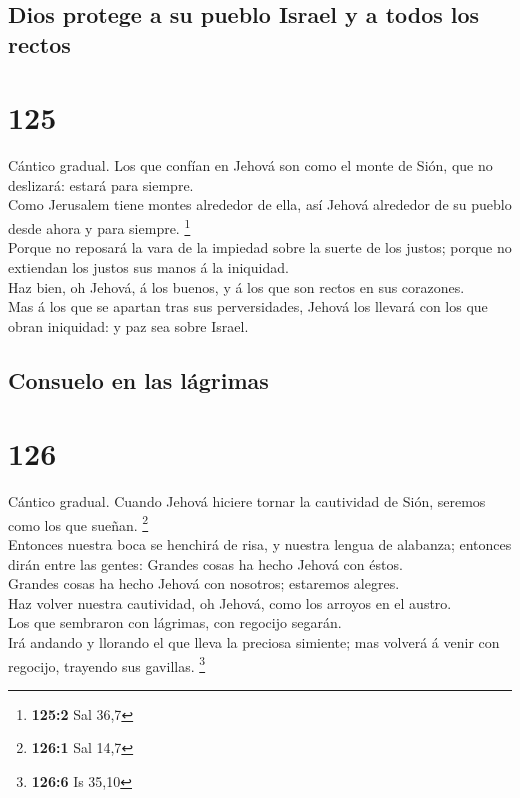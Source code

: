 \hypertarget{dios-protege-a-su-pueblo-israel-y-a-todos-los-rectos}{%
\subsection{Dios protege a su pueblo Israel y a todos los
rectos}\label{dios-protege-a-su-pueblo-israel-y-a-todos-los-rectos}}

\hypertarget{section-124}{%
\section{125}\label{section-124}}

 Cántico gradual. Los que confían en Jehová son como el
monte de Sión, que no deslizará: estará para siempre.\\
 Como Jerusalem tiene montes alrededor de ella, así Jehová
alrededor de su pueblo desde ahora y para siempre. \footnote{\textbf{125:2}
  Sal 36,7}\\
 Porque no reposará la vara de la impiedad sobre la suerte
de los justos; porque no extiendan los justos sus manos á la
iniquidad.\\
 Haz bien, oh Jehová, á los buenos, y á los que son rectos
en sus corazones.\\
 Mas á los que se apartan tras sus perversidades, Jehová
los llevará con los que obran iniquidad: y paz sea sobre Israel.

\hypertarget{consuelo-en-las-luxe1grimas}{%
\subsection{Consuelo en las
lágrimas}\label{consuelo-en-las-luxe1grimas}}

\hypertarget{section-125}{%
\section{126}\label{section-125}}

 Cántico gradual. Cuando Jehová hiciere tornar la
cautividad de Sión, seremos como los que sueñan. \footnote{\textbf{126:1}
  Sal 14,7}\\
 Entonces nuestra boca se henchirá de risa, y nuestra
lengua de alabanza; entonces dirán entre las gentes: Grandes cosas ha
hecho Jehová con éstos.\\
 Grandes cosas ha hecho Jehová con nosotros; estaremos
alegres.\\
 Haz volver nuestra cautividad, oh Jehová, como los
arroyos en el austro.\\
 Los que sembraron con lágrimas, con regocijo segarán.\\
 Irá andando y llorando el que lleva la preciosa simiente;
mas volverá á venir con regocijo, trayendo sus gavillas. \footnote{\textbf{126:6}
  Is 35,10}

